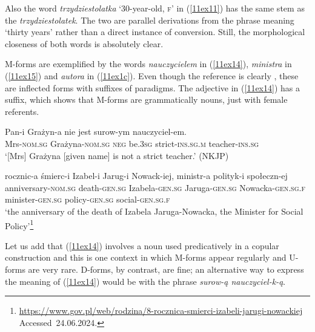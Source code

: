 \documentclass[output=paper,colorlinks,citecolor=brown]{langscibook}
\begin{document}
Also the word \emph{trzydziestolatka} `30-year-old, \textsc{f}' in (\ref{11ex11}) has the same stem as the  \emph{trzydziestolatek}. The two are parallel derivations from the phrase meaning `thirty years' rather than a direct instance of conversion. Still, the morphological closeness of both words is absolutely clear.

M-forms are exemplified by the words \emph{nauczycielem} in (\ref{11ex14}), \emph{ministra} in (\ref{11ex15}) and \emph{autora} in (\ref{11ex1c}). Even though the reference is clearly , these are inflected forms with suffixes of  paradigms. The adjective in (\ref{11ex14}) has a  suffix, which shows that M-forms are grammatically  nouns, just with female referents.

\begin{exe}
	\ex \label{11ex14}
	\gll Pan-i Grażyn-a nie jest surow-ym nauczyciel-em. \\
	Mrs-\textsc{nom.sg} Grażyna-\textsc{nom.sg} \textsc{neg} be.\textsc{3sg} strict-\textsc{ins.sg.m} teacher-\textsc{ins.sg} \\
	\trans ‘[Mrs] Grażyna [given name] is not a strict teacher.’ \hfill (NKJP)
	
	\ex \label{11ex15}
	\gll rocznic-a śmierc-i Izabel-i Jarug-i Nowack-iej, ministr-a polityk-i społeczn-ej \\
	anniversary-\textsc{nom.sg} death-\textsc{gen.sg} Izabela-\textsc{gen.sg} Jaruga-\textsc{gen.sg} Nowacka-\textsc{gen.sg.f} minister-\textsc{gen.sg} policy-\textsc{gen.sg} social-\textsc{gen.sg.f} \\
	\trans ‘the anniversary of the death of Izabela Jaruga-Nowacka, the Minister for Social Policy’\footnote{\url{https://www.gov.pl/web/rodzina/8-rocznica-smierci-izabeli-jarugi-nowackiej} \mbox{Accessed 24.06.2024.}}
\end{exe}

Let us add that (\ref{11ex14}) involves a noun used predicatively in a copular construction and this is one context in which M-forms appear regularly and U-forms are very rare. D-forms, by contrast, are fine; an alternative way to express the meaning of (\ref{11ex14}) would be with the phrase \emph{surow-ą nauczyciel-k-ą}.
\end{document}
